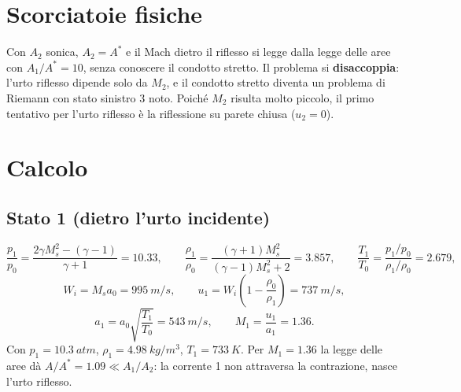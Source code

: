 \documentclass[11pt,a4paper]{article}
\begin{document}
\section{Scorciatoie fisiche}
Con $A_2$ sonica, $A_2=A^*$ e il Mach dietro il riflesso si legge dalla legge delle aree con $A_1/A^*=10$, senza
conoscere il condotto stretto. Il problema si \textbf{disaccoppia}: l'urto riflesso dipende solo da $M_2$, e il
condotto stretto diventa un problema di Riemann con stato sinistro 3 noto. Poiché $M_2$ risulta molto piccolo,
il primo tentativo per l'urto riflesso è la riflessione su parete chiusa ($u_2=0$).

\section{Calcolo}\label{sec:calcolo}

\subsection{Stato 1 (dietro l'urto incidente)}
\[
  \frac{p_1}{p_0}=\frac{2\gamma M_s^2-(\gamma-1)}{\gamma+1}=\num{10.33},\qquad
  \frac{\rho_1}{\rho_0}=\frac{(\gamma+1)M_s^2}{(\gamma-1)M_s^2+2}=\num{3.857},\qquad
  \frac{T_1}{T_0}=\frac{p_1/p_0}{\rho_1/\rho_0}=\num{2.679},
\]
\[
  W_i=M_sa_0=\SI{995}{m/s},\qquad u_1=W_i\left(1-\frac{\rho_0}{\rho_1}\right)=\SI{737}{m/s},
\]
\[
  a_1=a_0\sqrt{\frac{T_1}{T_0}}=\SI{543}{m/s},\qquad M_1=\frac{u_1}{a_1}=\num{1.36}.
\]
Con $p_1=\SI{10.3}{atm}$, $\rho_1=\SI{4.98}{kg/m^3}$, $T_1=\SI{733}{K}$. Per $M_1=\num{1.36}$ la legge delle aree
dà $A/A^*=\num{1.09}\ll A_1/A_2$: la corrente 1 non attraversa la contrazione, nasce l'urto riflesso.
\end{document}
